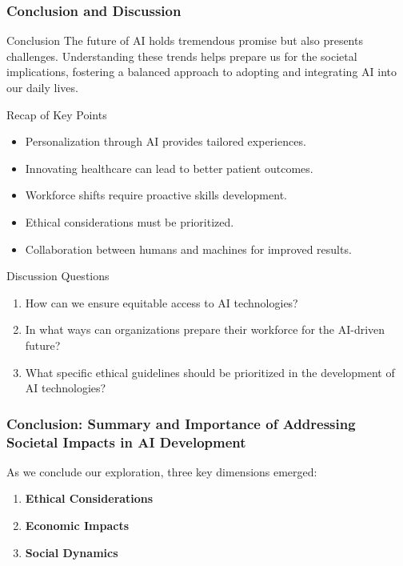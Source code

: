 \documentclass[aspectratio=169]{beamer}
\begin{document}
\begin{frame}[fragile]
    \frametitle{Conclusion and Discussion}
    \begin{block}{Conclusion}
        The future of AI holds tremendous promise but also presents challenges. Understanding these trends helps prepare us for the societal implications, fostering a balanced approach to adopting and integrating AI into our daily lives.
    \end{block}
    
    \begin{block}{Recap of Key Points}
        \begin{itemize}
            \item Personalization through AI provides tailored experiences.
            \item Innovating healthcare can lead to better patient outcomes.
            \item Workforce shifts require proactive skills development.
            \item Ethical considerations must be prioritized.
            \item Collaboration between humans and machines for improved results.
        \end{itemize}
    \end{block}
    
    \begin{block}{Discussion Questions}
        \begin{enumerate}
            \item How can we ensure equitable access to AI technologies?
            \item In what ways can organizations prepare their workforce for the AI-driven future?
            \item What specific ethical guidelines should be prioritized in the development of AI technologies?
        \end{enumerate}
    \end{block}
\end{frame}

\begin{frame}[fragile]
    \frametitle{Conclusion: Summary and Importance of Addressing Societal Impacts in AI Development}
    
    As we conclude our exploration, three key dimensions emerged:
    
    \begin{enumerate}
        \item \textbf{Ethical Considerations}
        \item \textbf{Economic Impacts}
        \item \textbf{Social Dynamics}
    \end{enumerate}
\end{frame}
\end{document}
